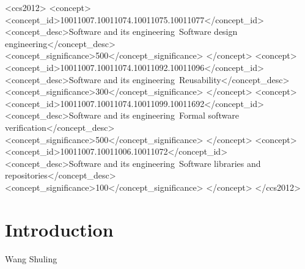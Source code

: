 \documentclass[manuscript, screen, review]{acmart}
\begin{document}
\begin{CCSXML}
<ccs2012>
   <concept>
       <concept_id>10011007.10011074.10011075.10011077</concept_id>
       <concept_desc>Software and its engineering~Software design engineering</concept_desc>
       <concept_significance>500</concept_significance>
       </concept>
   <concept>
       <concept_id>10011007.10011074.10011092.10011096</concept_id>
       <concept_desc>Software and its engineering~Reusability</concept_desc>
       <concept_significance>300</concept_significance>
       </concept>
   <concept>
       <concept_id>10011007.10011074.10011099.10011692</concept_id>
       <concept_desc>Software and its engineering~Formal software verification</concept_desc>
       <concept_significance>500</concept_significance>
       </concept>
   <concept>
       <concept_id>10011007.10011006.10011072</concept_id>
       <concept_desc>Software and its engineering~Software libraries and repositories</concept_desc>
       <concept_significance>100</concept_significance>
       </concept>
 </ccs2012>
\end{CCSXML}




\maketitle


\section{Introduction}

Wang Shuling
\end{document}
